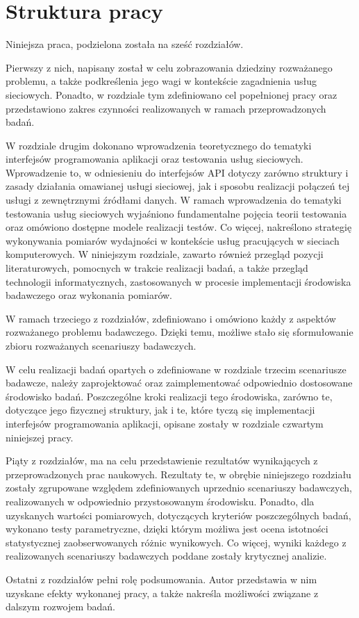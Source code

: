 \section{Struktura pracy}
Niniejsza praca, podzielona została na sześć rozdziałów.

Pierwszy z nich, napisany został w celu zobrazowania dziedziny rozważanego problemu, a także podkreślenia jego wagi w kontekście zagadnienia usług sieciowych. Ponadto, w rozdziale tym zdefiniowano cel popełnionej pracy oraz przedstawiono zakres czynności realizowanych w ramach przeprowadzonych badań.

W rozdziale drugim dokonano wprowadzenia teoretycznego do tematyki interfejsów programowania aplikacji oraz testowania usług sieciowych. Wprowadzenie to, w odniesieniu do interfejsów API dotyczy zarówno struktury i zasady działania omawianej usługi sieciowej, jak i sposobu realizacji połączeń tej usługi z zewnętrznymi źródłami danych. W ramach wprowadzenia do tematyki testowania usług sieciowych wyjaśniono fundamentalne pojęcia teorii testowania oraz omówiono dostępne modele realizacji testów. Co więcej, nakreślono strategię wykonywania pomiarów wydajności w kontekście usług pracujących w sieciach komputerowych. W niniejszym rozdziale, zawarto również przegląd pozycji literaturowych, pomocnych w trakcie realizacji badań, a także przegląd technologii informatycznych, zastosowanych w procesie implementacji środowiska badawczego oraz wykonania pomiarów.

W ramach trzeciego z rozdziałów, zdefiniowano i omówiono każdy z aspektów rozważanego problemu badawczego. Dzięki temu, możliwe stało się sformułowanie zbioru rozważanych scenariuszy badawczych. 

W celu realizacji badań opartych o zdefiniowane w rozdziale trzecim scenariusze badawcze, należy zaprojektować oraz zaimplementować odpowiednio dostosowane środowisko badań. Poszczególne kroki realizacji tego środowiska, zarówno te, dotyczące jego fizycznej struktury, jak i te, które tyczą się implementacji interfejsów programowania aplikacji, opisane zostały w rozdziale czwartym niniejszej pracy. 

Piąty z rozdziałów, ma na celu przedstawienie rezultatów wynikających z przeprowadzonych prac naukowych. Rezultaty te, w obrębie niniejszego rozdziału zostały zgrupowane względem zdefiniowanych uprzednio scenariuszy badawczych, realizowanych w odpowiednio przystosowanym środowisku. Ponadto, dla uzyskanych wartości pomiarowych, dotyczących kryteriów poszczególnych badań, wykonano testy parametryczne, dzięki którym możliwa jest ocena istotności statystycznej zaobserwowanych różnic wynikowych. Co więcej, wyniki każdego z realizowanych scenariuszy badawczych poddane zostały krytycznej analizie.

Ostatni z rozdziałów pełni rolę podsumowania. Autor przedstawia w nim uzyskane efekty wykonanej pracy, a także nakreśla możliwości związane z dalszym rozwojem badań.